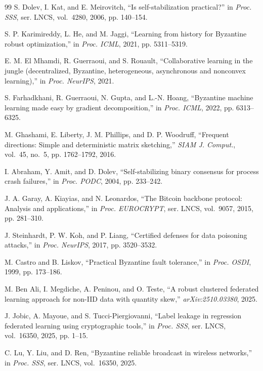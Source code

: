 \begin{thebibliography}{99}
 S. Dolev, I. Kat, and E. Meirovitch, ``Is self-stabilization practical?'' in \textit{Proc. SSS}, ser. LNCS, vol.~4280, 2006, pp. 140--154.

 S. P. Karimireddy, L. He, and M. Jaggi, ``Learning from history for Byzantine robust optimization,'' in \textit{Proc. ICML}, 2021, pp. 5311--5319.

 E. M. El Mhamdi, R. Guerraoui, and S. Rouault, ``Collaborative learning in the jungle (decentralized, Byzantine, heterogeneous, asynchronous and nonconvex learning),'' in \textit{Proc. NeurIPS}, 2021.

 S. Farhadkhani, R. Guerraoui, N. Gupta, and L.-N. Hoang, ``Byzantine machine learning made easy by gradient decomposition,'' in \textit{Proc. ICML}, 2022, pp. 6313--6325.

 M. Ghashami, E. Liberty, J. M. Phillips, and D. P. Woodruff, ``Frequent directions: Simple and deterministic matrix sketching,'' \textit{SIAM J. Comput.}, vol.~45, no.~5, pp. 1762--1792, 2016.

 I. Abraham, Y. Amit, and D. Dolev, ``Self-stabilizing binary consensus for process crash failures,'' in \textit{Proc. PODC}, 2004, pp. 233--242.

 J. A. Garay, A. Kiayias, and N. Leonardos, ``The Bitcoin backbone protocol: Analysis and applications,'' in \textit{Proc. EUROCRYPT}, ser. LNCS, vol.~9057, 2015, pp. 281--310.

 J. Steinhardt, P. W. Koh, and P. Liang, ``Certified defenses for data poisoning attacks,'' in \textit{Proc. NeurIPS}, 2017, pp. 3520--3532.

 M. Castro and B. Liskov, ``Practical Byzantine fault tolerance,'' in \textit{Proc. OSDI}, 1999, pp. 173--186.

 M. Ben Ali, I. Megdiche, A. Peninou, and O. Teste, ``A robust clustered federated learning approach for non-IID data with quantity skew,'' \textit{arXiv:2510.03380}, 2025.

 J. Jobic, A. Mayoue, and S. Tucci-Piergiovanni, ``Label leakage in regression federated learning using cryptographic tools,'' in \textit{Proc. SSS}, ser. LNCS, vol.~16350, 2025, pp. 1--15.

 C. Lu, Y. Liu, and D. Ren, ``Byzantine reliable broadcast in wireless networks,'' in \textit{Proc. SSS}, ser. LNCS, vol.~16350, 2025.


\end{thebibliography}
